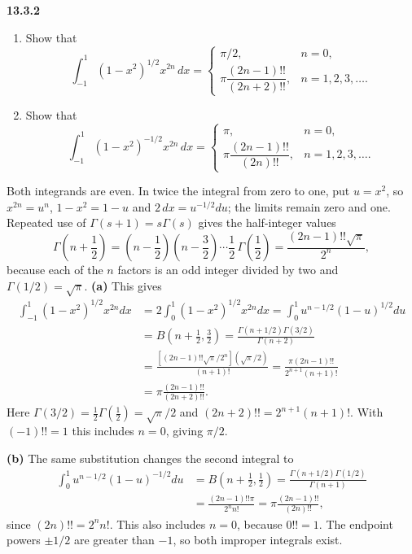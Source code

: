 \par\bigskip
\noindent\textbf{13.3.2}\quad
\begin{enumerate}
\item[(a)] Show that
  \[
  \int_{-1}^{1}(1-x^{2})^{1/2}x^{2n}\,dx=\begin{cases}
  \pi/2, & n=0,\\[4pt]
  \pi\dfrac{(2n-1)!!}{(2n+2)!!}, & n=1,2,3,\ldots.
  \end{cases}
  \]
\item[(b)] Show that
  \[
  \int_{-1}^{1}(1-x^{2})^{-1/2}x^{2n}\,dx=\begin{cases}
  \pi, & n=0,\\[4pt]
  \pi\dfrac{(2n-1)!!}{(2n)!!}, & n=1,2,3,\ldots.
  \end{cases}
  \]
\end{enumerate}
\solution
Both integrands are even.  In twice the integral from zero to one,
put $u=x^2$, so $x^{2n}=u^n$, $1-x^2=1-u$ and
$2\,dx=u^{-1/2}du$; the limits remain zero and one.  Repeated use of
$\Gamma(s+1)=s\Gamma(s)$ gives the half-integer values
\[
\Gamma\left(n+\frac12\right)
=\left(n-\frac12\right)\left(n-\frac32\right)\cdots\frac12\,
\Gamma\left(\frac12\right)
=\frac{(2n-1)!!\sqrt\pi}{2^n},
\]
because each of the $n$ factors is an odd integer divided by two
and $\Gamma(1/2)=\sqrt\pi$.
\textbf{(a)} This gives
\begin{align*}
\int_{-1}^1(1-x^2)^{1/2}x^{2n}dx
&=2\int_0^1(1-x^2)^{1/2}x^{2n}dx
=\int_0^1u^{n-1/2}(1-u)^{1/2}du\\
&=B\left(n+\frac12,\frac32\right)
=\frac{\Gamma(n+1/2)\Gamma(3/2)}{\Gamma(n+2)}\\
&=\frac{[(2n-1)!!\sqrt\pi/2^n](\sqrt\pi/2)}{(n+1)!}
=\frac{\pi(2n-1)!!}{2^{n+1}(n+1)!}\\
&=\boxed{\pi\frac{(2n-1)!!}{(2n+2)!!}}.
\end{align*}
Here $\Gamma(3/2)=\frac12\Gamma(\frac12)=\sqrt\pi/2$ and
$(2n+2)!!=2^{n+1}(n+1)!$.  With $(-1)!!=1$ this
includes $n=0$, giving $\pi/2$.

\textbf{(b)} The same substitution changes the second integral to
\begin{align*}
\int_0^1u^{n-1/2}(1-u)^{-1/2}du
&=B\left(n+\frac12,\frac12\right)
=\frac{\Gamma(n+1/2)\Gamma(1/2)}{\Gamma(n+1)}\\
&=\frac{(2n-1)!!\pi}{2^nn!}
=\boxed{\pi\frac{(2n-1)!!}{(2n)!!}},
\end{align*}
since $(2n)!!=2^nn!$.
This also includes $n=0$, because $0!!=1$.  The endpoint powers
$\pm1/2$ are greater than $-1$, so both improper integrals exist.


